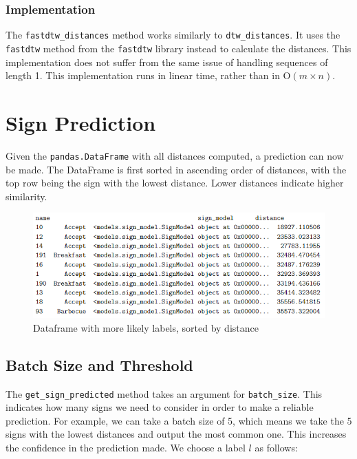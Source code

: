 \documentclass[final,rdr32.tex]{subfiles}
\begin{document}
\subsubsection{Implementation}

The \verb|fastdtw_distances| method works similarly to \verb|dtw_distances|. It uses the \verb|fastdtw| method from the \verb|fastdtw| library instead to calculate the distances. This implementation does not suffer from the same issue of handling sequences of length 1. This implementation runs in linear time, rather than in O$(m \times n)$.

\section{Sign Prediction}

Given the \verb|pandas.DataFrame| with all distances computed, a prediction can now be made. The DataFrame is first sorted in ascending order of distances, with the top row being the sign with the lowest distance. Lower distances indicate higher similarity.

\begin{figure}[H]
    \begin{center}
        \includegraphics[scale=1]{images/dataframe.png}
        \caption{Dataframe with more likely labels, sorted by distance}
    \end{center}
\end{figure}

\subsection{Batch Size and Threshold}
\label{sec:batch}

The \verb|get_sign_predicted| method takes an argument for \verb|batch_size|. This indicates how many signs we need to consider in order to make a reliable prediction. For example, we can take a batch size of 5, which means we take the 5 signs with the lowest distances and output the most common one. This increases the confidence in the prediction made. We choose a label $l$ as follows:
\end{document}
